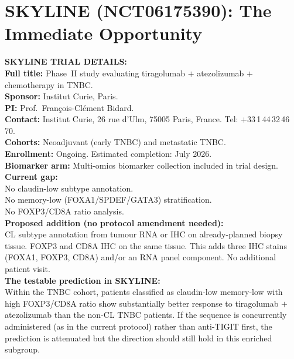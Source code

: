 \documentclass[12pt, a4paper]{article}
\begin{document}
\section{SKYLINE (NCT06175390): The Immediate
Opportunity}

\begin{center}
\colorbox{actionbox}{
\begin{minipage}{0.88\textwidth}
\vspace{0.5em}
\textbf{SKYLINE TRIAL DETAILS:}\\[0.4em]
\textbf{Full title:} Phase~II study evaluating
tiragolumab $+$ atezolizumab $+$ chemotherapy
in TNBC.\\[0.3em]
\textbf{Sponsor:} Institut Curie, Paris.\\[0.3em]
\textbf{PI:} Prof.\ Fran\c{c}ois-Cl\'{e}ment Bidard.\\[0.3em]
\textbf{Contact:} Institut Curie, 26 rue d'Ulm,
75005 Paris, France. Tel: $+$33\,1\,44\,32\,46\,70.\\[0.3em]
\textbf{Cohorts:} Neoadjuvant (early TNBC) and
metastatic TNBC.\\[0.3em]
\textbf{Enrollment:} Ongoing. Estimated
completion: July 2026.\\[0.3em]
\textbf{Biomarker arm:} Multi-omics biomarker
collection included in trial design.\\[0.4em]
\textbf{Current gap:}\\
No claudin-low subtype annotation.\\
No memory-low (FOXA1/SPDEF/GATA3) stratification.\\
No FOXP3/CD8A ratio analysis.\\[0.4em]
\textbf{Proposed addition (no protocol amendment
needed):}\\
CL subtype annotation from tumour RNA or IHC
on already-planned biopsy tissue. FOXP3 and
CD8A IHC on the same tissue. This adds three
IHC stains (FOXA1, FOXP3, CD8A) and/or an RNA
panel component. No additional patient visit.\\[0.4em]
\textbf{The testable prediction in SKYLINE:}\\
Within the TNBC cohort, patients classified as
claudin-low memory-low with high FOXP3/CD8A
ratio show substantially better response to
tiragolumab $+$ atezolizumab than the
non-CL TNBC patients. If the sequence is
concurrently administered (as in the current
protocol) rather than anti-TIGIT first, the
prediction is attenuated but the direction
should still hold in this enriched subgroup.
\vspace{0.5em}
\end{minipage}}
\end{center}
\end{document}
